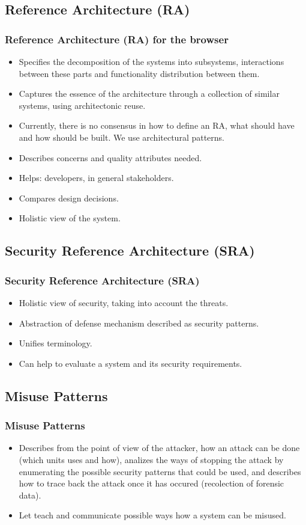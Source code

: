 \documentclass[serif,9pt]{beamer}
\begin{document}
\subsection{Reference Architecture (RA)}
\begin{frame}
	\frametitle{Reference Architecture (RA) for the browser}
		\begin{itemize}
			\item<1> Specifies the decomposition of the systems into subsystems, interactions between these parts and functionality distribution between them.
			\item<1> Captures the essence of the architecture through a collection of similar systems, using architectonic reuse.
			\item<1> Currently, there is no consensus in how to define an RA, what should have and how should be built. We use architectural patterns.
			\item<2> Describes concerns and quality attributes needed.
			\item<2> Helps: developers, in general stakeholders.
			\item<2> Compares design decisions.
			\item<3> Holistic view of the system.
		\end{itemize}
\end{frame}

\subsection{Security Reference Architecture (SRA)}
\begin{frame}
	\frametitle{Security Reference Architecture (SRA)}
	\begin{itemize}
		\item<1> Holistic view of security, taking into account the threats.
		\item<1> Abstraction of defense mechanism described as security patterns.
		\item<2> Unifies terminology.
		\item<2> Can help to evaluate a system and its security requirements.
	\end{itemize}
\end{frame}

\subsection{Misuse Patterns}
\begin{frame}
	\frametitle{Misuse Patterns}
	\begin{itemize}
		\item<1> Describes from the point of view of the attacker, how an attack can be done (which units uses and how), analizes the ways of stopping the attack by enumerating the possible security patterns that could be used, and describes how to trace back the attack once it has occured (recolection of forensic data).
		\item<2> Let teach and communicate possible ways how a system can be misused.
	\end{itemize}
\end{frame}
\end{document}
